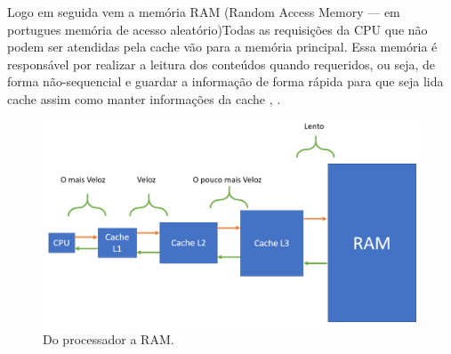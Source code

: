 Logo em seguida vem a memória RAM (Random Access Memory — em portugues memória de acesso aleatório)Todas as requisições da CPU que não podem ser atendidas pela cache vão para a memória principal. Essa memória é responsável por realizar a leitura dos conteúdos quando requeridos, ou seja, de forma não-sequencial e guardar a informação de forma rápida para que seja lida cache assim como manter informações da cache \cite{Tanenbaum2016}, \cite{Comer2012}.\\
\begin{figure}[htpb]
    \centering
   \includegraphics[scale=0.25]{imagens/velocidaderam.png}
   \caption{Do processador a RAM.}
   \label{fig:velocidade}
\end{figure}\\


